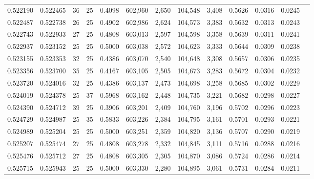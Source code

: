 \begin{tabular}{rrrrrrrrrrrrr}
0.522190 & 0.522465 &    36 &  25 &                                     0.4098 & 602,960 &   2,650 & 104,548 &   3,408 & 0.5626 & 0.0316 & 0.0245 \\
0.522487 & 0.522738 &    26 &  25 &                                     0.4902 & 602,986 &   2,624 & 104,573 &   3,383 & 0.5632 & 0.0313 & 0.0243 \\
0.522743 & 0.522933 &    27 &  25 &                                     0.4808 & 603,013 &   2,597 & 104,598 &   3,358 & 0.5639 & 0.0311 & 0.0241 \\
0.522937 & 0.523152 &    25 &  25 &                                     0.5000 & 603,038 &   2,572 & 104,623 &   3,333 & 0.5644 & 0.0309 & 0.0238 \\
0.523155 & 0.523353 &    32 &  25 &                                     0.4386 & 603,070 &   2,540 & 104,648 &   3,308 & 0.5657 & 0.0306 & 0.0235 \\
0.523356 & 0.523700 &    35 &  25 &                                     0.4167 & 603,105 &   2,505 & 104,673 &   3,283 & 0.5672 & 0.0304 & 0.0232 \\
0.523720 & 0.524016 &    32 &  25 &                                     0.4386 & 603,137 &   2,473 & 104,698 &   3,258 & 0.5685 & 0.0302 & 0.0229 \\
0.524019 & 0.524378 &    25 &  37 &                                     0.5968 & 603,162 &   2,448 & 104,735 &   3,221 & 0.5682 & 0.0298 & 0.0227 \\
0.524390 & 0.524712 &    39 &  25 &                                     0.3906 & 603,201 &   2,409 & 104,760 &   3,196 & 0.5702 & 0.0296 & 0.0223 \\
0.524729 & 0.524987 &    25 &  35 &                                     0.5833 & 603,226 &   2,384 & 104,795 &   3,161 & 0.5701 & 0.0293 & 0.0221 \\
0.524989 & 0.525204 &    25 &  25 &                                     0.5000 & 603,251 &   2,359 & 104,820 &   3,136 & 0.5707 & 0.0290 & 0.0219 \\
0.525207 & 0.525474 &    27 &  25 &                                     0.4808 & 603,278 &   2,332 & 104,845 &   3,111 & 0.5716 & 0.0288 & 0.0216 \\
0.525476 & 0.525712 &    27 &  25 &                                     0.4808 & 603,305 &   2,305 & 104,870 &   3,086 & 0.5724 & 0.0286 & 0.0214 \\
0.525715 & 0.525943 &    25 &  25 &                                     0.5000 & 603,330 &   2,280 & 104,895 &   3,061 & 0.5731 & 0.0284 & 0.0211 \\

\end{tabular}
